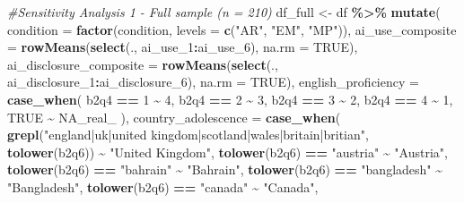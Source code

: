 \documentclass[
]{article}
\newenvironment{Shaded}{\begin{snugshade}}{\end{snugshade}}
\newcommand{\AttributeTok}[1]{\textcolor[rgb]{0.13,0.29,0.53}{#1}}
\newcommand{\CommentTok}[1]{\textcolor[rgb]{0.56,0.35,0.01}{\textit{#1}}}
\newcommand{\ConstantTok}[1]{\textcolor[rgb]{0.56,0.35,0.01}{#1}}
\newcommand{\DecValTok}[1]{\textcolor[rgb]{0.00,0.00,0.81}{#1}}
\newcommand{\FunctionTok}[1]{\textcolor[rgb]{0.13,0.29,0.53}{\textbf{#1}}}
\newcommand{\NormalTok}[1]{#1}
\newcommand{\OtherTok}[1]{\textcolor[rgb]{0.56,0.35,0.01}{#1}}
\newcommand{\SpecialCharTok}[1]{\textcolor[rgb]{0.81,0.36,0.00}{\textbf{#1}}}
\newcommand{\StringTok}[1]{\textcolor[rgb]{0.31,0.60,0.02}{#1}}
\begin{document}
\begin{Shaded}
\begin{Highlighting}[]
\CommentTok{\#Sensitivity Analysis 1 {-} Full sample (n = 210)}
\NormalTok{df\_full }\OtherTok{\textless{}{-}}\NormalTok{ df }\SpecialCharTok{\%\textgreater{}\%}
  \FunctionTok{mutate}\NormalTok{(}
    \AttributeTok{condition =} \FunctionTok{factor}\NormalTok{(condition, }\AttributeTok{levels =} \FunctionTok{c}\NormalTok{(}\StringTok{"AR"}\NormalTok{, }\StringTok{"EM"}\NormalTok{, }\StringTok{"MP"}\NormalTok{)),}
    \AttributeTok{ai\_use\_composite =} \FunctionTok{rowMeans}\NormalTok{(}\FunctionTok{select}\NormalTok{(., ai\_use\_1}\SpecialCharTok{:}\NormalTok{ai\_use\_6), }\AttributeTok{na.rm =} \ConstantTok{TRUE}\NormalTok{),}
    \AttributeTok{ai\_disclosure\_composite =} \FunctionTok{rowMeans}\NormalTok{(}\FunctionTok{select}\NormalTok{(., ai\_disclosure\_1}\SpecialCharTok{:}\NormalTok{ai\_disclosure\_6), }\AttributeTok{na.rm =} \ConstantTok{TRUE}\NormalTok{),}
    \AttributeTok{english\_proficiency =} \FunctionTok{case\_when}\NormalTok{(}
\NormalTok{      b2q4 }\SpecialCharTok{==} \DecValTok{1} \SpecialCharTok{\textasciitilde{}} \DecValTok{4}\NormalTok{,}
\NormalTok{      b2q4 }\SpecialCharTok{==} \DecValTok{2} \SpecialCharTok{\textasciitilde{}} \DecValTok{3}\NormalTok{,}
\NormalTok{      b2q4 }\SpecialCharTok{==} \DecValTok{3} \SpecialCharTok{\textasciitilde{}} \DecValTok{2}\NormalTok{,}
\NormalTok{      b2q4 }\SpecialCharTok{==} \DecValTok{4} \SpecialCharTok{\textasciitilde{}} \DecValTok{1}\NormalTok{,}
      \ConstantTok{TRUE} \SpecialCharTok{\textasciitilde{}} \ConstantTok{NA\_real\_}
\NormalTok{    ),}
    \AttributeTok{country\_adolescence =} \FunctionTok{case\_when}\NormalTok{(}
      \FunctionTok{grepl}\NormalTok{(}\StringTok{"england|uk|united kingdom|scotland|wales|britain|britian"}\NormalTok{,}
            \FunctionTok{tolower}\NormalTok{(b2q6)) }\SpecialCharTok{\textasciitilde{}} \StringTok{"United Kingdom"}\NormalTok{,}
      \FunctionTok{tolower}\NormalTok{(b2q6) }\SpecialCharTok{==} \StringTok{"austria"}         \SpecialCharTok{\textasciitilde{}} \StringTok{"Austria"}\NormalTok{,}
      \FunctionTok{tolower}\NormalTok{(b2q6) }\SpecialCharTok{==} \StringTok{"bahrain"}         \SpecialCharTok{\textasciitilde{}} \StringTok{"Bahrain"}\NormalTok{,}
      \FunctionTok{tolower}\NormalTok{(b2q6) }\SpecialCharTok{==} \StringTok{"bangladesh"}      \SpecialCharTok{\textasciitilde{}} \StringTok{"Bangladesh"}\NormalTok{,}
      \FunctionTok{tolower}\NormalTok{(b2q6) }\SpecialCharTok{==} \StringTok{"canada"}          \SpecialCharTok{\textasciitilde{}} \StringTok{"Canada"}\NormalTok{,}

\end{Highlighting}
\end{Shaded}
\end{document}
